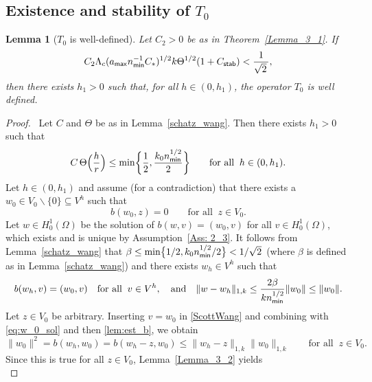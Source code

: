 \documentclass[numbers,webpdf,imaiai]{ima-authoring-template}%
\theoremstyle{thmstyletwo}%
\newtheorem{lemma}[theorem]{Lemma}
\numberwithin{equation}{section}
\newcommand{\Cstar}{C_{\ast}}
\numberwithin{equation}{section}
\newcommand{\Cstab}{C_{\textup{\textsf{stab}}}}
\newcommand{\amax}{a_{\textup{\textsf{max}}}}
\newcommand{\nmin}{n_{\textup{\textsf{min}}}}
\begin{document}
{\subsection[Existence and stability of $T_0$]{Existence and stability of {\boldmath$T_0$}}


\begin{lemma}[$T_0$ is well-defined] \label{lemma_3_5}
Let $C_2>0$ be as in Theorem~\ref{Lemma_3_1}.  If  
\begin{equation}\label{3_7_a}
	C_2 \Lambda_c (\amax \nmin^{-1} \Cstar)^{1/2} k\Theta^{1/2} (1 + \Cstab) < \frac{1}{\sqrt{2}\,}, 
\end{equation}
then there exists $h_1 > 0$ such that, for all $h\in(0,h_1)$, the operator $T_0$ is well defined.
\end{lemma}

\begin{proof}\,
Let $C$ and $\Theta$ be as in Lemma~\ref{schatz_wang}.
Then there exists $h_1>0$ such that
\[
	C\,\Theta\Bigl(\frac{h}{r}\Bigr) \le \min\biggl\{\frac{1}{2},\frac{k_0\nmin^{1/2}}{2}\biggr\}
	\qquad \text{for all} \;\; h\in(0,h_1).
\]
Let $h\in(0,h_1)$ and
assume (for a contradiction) that there exists a $w_0 \in V_0\backslash \lbrace 0 \rbrace {\subseteq V^h}$ such that
\begin{equation}\label{eq:w_0_sol}
	b(w_0,z) = 0 \qquad \text{for all} \;\; z \in V_0.
\end{equation}
Let $w \in H^1_0(\Omega)$ be the solution of $b(w,v)=(w_0,v)$ for all $v \in H^1_0(\Omega)$, 
which exists and is unique by Assumption~\ref{Ass: 2_3}.
It follows from Lemma~\ref{schatz_wang} that $\beta\le\min\bigl\{1/2,k_0\nmin^{1/2}/2\bigr\}<1/\sqrt{2}$
(where $\beta$ is defined as in Lemma~\ref{schatz_wang})
and there exists $w_h \in V^h$ such that
\begin{equation}
	b(w_h, v) = (w_0,v) \quad \text{for all} \;\; v \in V^h, \quad \text{and} \quad 
	\|w - w_h\|_{1,k} \le \frac{2 \beta}{k \nmin^{1/2}} \|w_0\| \le \|w_0\|.   
	\label{ScottWang}
\end{equation}
Let $z\in V_0$ be arbitrary.
Inserting $v=w_0$ in \eqref{ScottWang} and combining with \eqref{eq:w_0_sol} and then \eqref{lem:est_b}, we obtain
\begin{equation*}
	\|w_0\|^2 = b(w_h, w_0) = b(w_h - z, w_0)
	\le \|w_h - z\|_{1,k} \|w_0\|_{1,k} \qquad\text{for all} \;\; z \in V_0.
\end{equation*}
Since this is true for all $z \in V_0$, Lemma~\ref{Lemma_3_2} yields  
\begin{equation}\label{eq: 3_5_f_sq}

\end{equation}
\end{proof}}
\end{document}
